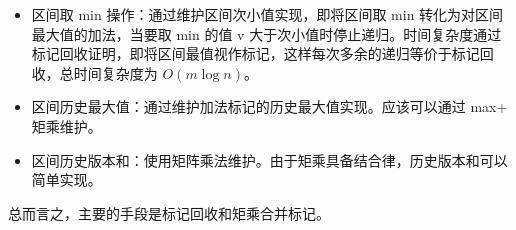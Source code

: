 \begin{itemize}
    \item 区间取 min 操作：通过维护区间次小值实现，即将区间取 min 转化为对区间最大值的加法，当要取 min 的值 v 大于次小值时停止递归。时间复杂度通过标记回收证明，即将区间最值视作标记，这样每次多余的递归等价于标记回收，总时间复杂度为 $O(m\log n)$。
    \item 区间历史最大值：通过维护加法标记的历史最大值实现。应该可以通过 max+ 矩乘维护。
    \item 区间历史版本和：使用矩阵乘法维护。由于矩乘具备结合律，历史版本和可以简单实现。
\end{itemize}
总而言之，主要的手段是标记回收和矩乘合并标记。
\inputminted{cpp}{src/data structure/seg-beats.cpp}